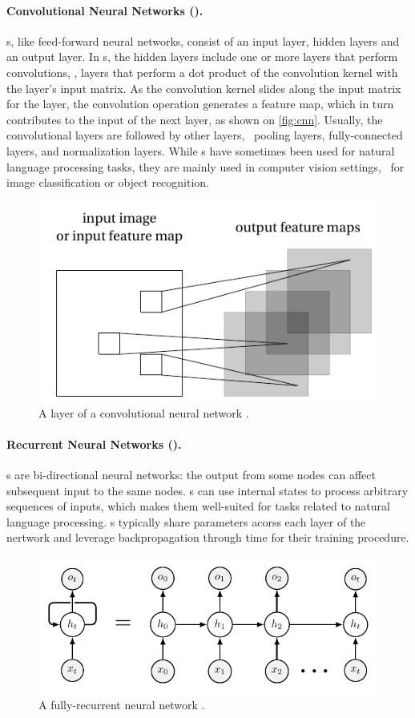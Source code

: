 \paragraph{Convolutional Neural Networks (\cnn).}
\cnn s, like feed-forward neural networks, consist of an input layer, hidden layers and an output layer. In \cnn s, the hidden layers include one or more layers that perform convolutions, \ie, layers that perform a dot product of the convolution kernel with the layer's input matrix. As the convolution kernel slides along the input matrix for the layer, the convolution operation generates a feature map, which in turn contributes to the input of the next layer, as shown on \autoref{fig:cnn}. Usually, the convolutional layers are followed by other layers, \eg\ pooling layers, fully-connected layers, and normalization layers. While \cnn s have sometimes been used for natural language processing tasks, they are mainly used in computer vision settings, \eg\ for image classification or object recognition.

\begin{figure}[h!]
    \centering
    \includegraphics[width=0.5\columnwidth]{chapter2/pictures/convolutional_neural_network.pdf}
    \caption{A layer of a convolutional neural network \citep{stutzIllustratingConvolutionalNeural2020}.}
    \label{fig:cnn}
\end{figure}

\paragraph{Recurrent Neural Networks (\rnn).}
\rnn s are bi-directional neural networks: the output from some nodes can affect subsequent input to the same nodes. \rnn s can use internal states to process arbitrary sequences of inputs, which makes them well-suited for tasks related to natural language processing. \rnn s typically share parameters acorss each layer of the nertwork and leverage backpropagation through time for their training procedure.

\begin{figure}[h!]
    \centering
    \includegraphics[width=0.8\columnwidth]{chapter2/pictures/tikz_rnn.pdf}
    \caption{A fully-recurrent neural network \citep{user1217992019tikz}.}
    \label{fig:tikz_rnn}
\end{figure}

